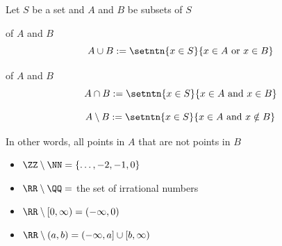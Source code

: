 \begin{frame}

    
    Let $S$ be a set and $A$ and $B$ be subsets of $S$

    \vspace{1em}
    
     of $A$ and $B$ 
    \begin{equation*}
        A \cup B := 
            \setntn{x \in S}{x \in A \text{ or } x \in B}
    \end{equation*}
    
     of $A$ and $B$
    \begin{equation*}
        A \cap B := 
            \setntn{x \in S}{x \in A \text{ and } x \in B}
    \end{equation*}

\end{frame}

\begin{frame}
    
    \begin{equation*}
        A \setminus B := 
            \setntn{x \in S}{x \in A \text{ and } x \notin B}
    \end{equation*}


    In other words, all points in $A$ that are not points in $B$

    \vspace{1em}

    \Egs

    \begin{itemize}
        \item $\ZZ \setminus \NN = \{\ldots, -2, -1, 0\}$
        \item $\RR \setminus \QQ = $ the set of irrational numbers
        \item $\RR \setminus [0, \infty) = (-\infty, 0)$
        \item $\RR \setminus (a, b) = (-\infty, a] \cup [b, \infty)$
    \end{itemize}

\end{frame}





